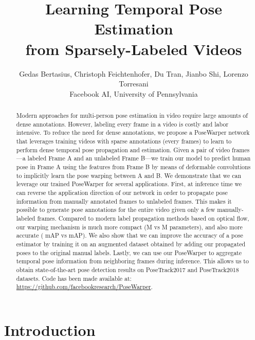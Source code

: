 \documentclass{article}
\title{Learning Temporal Pose Estimation\\from Sparsely-Labeled Videos}
\author{Gedas Bertasius, Christoph Feichtenhofer, Du Tran, Jianbo Shi, Lorenzo Torresani\\
Facebook AI, University of Pennsylvania}
\begin{document}
\maketitle

\begin{abstract}

Modern approaches for multi-person pose estimation in video require large amounts of dense annotations. However, labeling every frame in a video is costly and labor intensive. To reduce the need for dense annotations, we propose a PoseWarper network that leverages training videos with sparse annotations (every  frames) to learn to perform dense temporal pose propagation and estimation. Given a pair of video frames---a labeled Frame A and an unlabeled Frame B---we train our model to predict human pose in Frame A using the features from Frame B by means of deformable convolutions to implicitly learn the pose warping between A and B. We demonstrate that we can leverage our trained PoseWarper for several applications. First, at inference time we can reverse the application direction of our network in order to propagate pose information from manually annotated frames to unlabeled frames. This makes it possible to generate pose annotations for the entire video given only a few manually-labeled frames. Compared to modern label propagation methods based on optical flow, our warping mechanism is much more compact (M vs M parameters), and also more accurate ( mAP vs  mAP). We also show that we can improve the accuracy of a pose estimator by training it on an augmented dataset obtained by adding our propagated poses to the original manual labels. Lastly, we can use our PoseWarper to aggregate temporal pose information from neighboring frames during inference. This allows us to obtain state-of-the-art pose detection results on PoseTrack2017 and PoseTrack2018 datasets. Code has been made available at: \url{https://github.com/facebookresearch/PoseWarper}.

















\end{abstract}





\section{Introduction}
\end{document}
